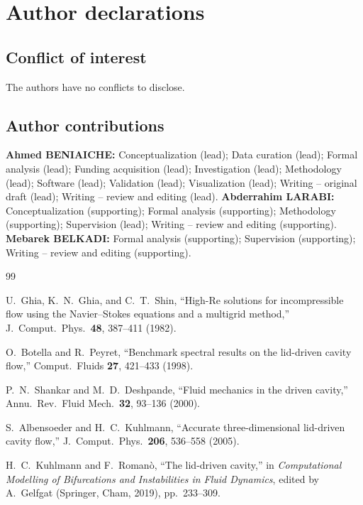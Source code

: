 \documentclass[11pt,a4paper]{article}
\newenvironment{chgadd}{\par\color{blue}}{\par\color{black}}
\begin{document}
\begin{chgadd}
\section*{Author declarations}

\subsection*{Conflict of interest}
The authors have no conflicts to disclose.

\subsection*{Author contributions}
\textbf{Ahmed BENIAICHE:} Conceptualization (lead); Data curation (lead);
Formal analysis (lead); Funding acquisition (lead); Investigation (lead);
Methodology (lead); Software (lead); Validation (lead); Visualization (lead);
Writing -- original draft (lead); Writing -- review and editing (lead).
\textbf{Abderrahim LARABI:} Conceptualization (supporting); Formal analysis
(supporting); Methodology (supporting); Supervision (lead); Writing -- review and
editing (supporting).
\textbf{Mebarek BELKADI:} Formal analysis (supporting); Supervision (supporting);
Writing -- review and editing (supporting).

\begin{thebibliography}{99}

U.~Ghia, K.~N.~Ghia, and C.~T.~Shin,
``High-Re solutions for incompressible flow using the Navier--Stokes equations and
a multigrid method,'' J.\ Comput.\ Phys.\ \textbf{48}, 387--411 (1982).

O.~Botella and R.~Peyret,
``Benchmark spectral results on the lid-driven cavity flow,''
Comput.\ Fluids \textbf{27}, 421--433 (1998).

P.~N.~Shankar and M.~D.~Deshpande,
``Fluid mechanics in the driven cavity,''
Annu.\ Rev.\ Fluid Mech.\ \textbf{32}, 93--136 (2000).

S.~Albensoeder and H.~C.~Kuhlmann,
``Accurate three-dimensional lid-driven cavity flow,''
J.\ Comput.\ Phys.\ \textbf{206}, 536--558 (2005).

H.~C.~Kuhlmann and F.~Roman\`o,
``The lid-driven cavity,'' in \textit{Computational Modelling of Bifurcations and
Instabilities in Fluid Dynamics}, edited by A.~Gelfgat (Springer, Cham, 2019),
pp.~233--309.


\end{thebibliography}
\end{chgadd}
\end{document}
